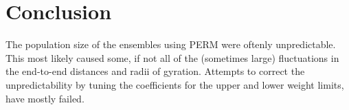 \section{Conclusion}


The population size of the ensembles using PERM were oftenly unpredictable. This most likely caused some, if not all of the (sometimes large) fluctuations in the end-to-end distances and radii of gyration. Attempts to correct the unpredictability by tuning the coefficients for the upper and lower weight limits, have mostly failed.